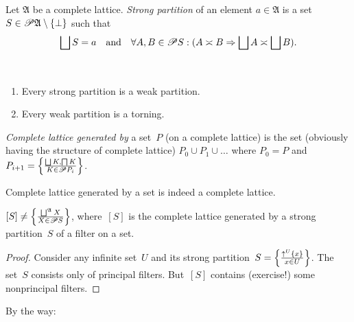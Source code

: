 \begin{defn}
Let $\mathfrak{A}$ be a complete lattice.
\emph{Strong partition} of an element $a\in\mathfrak{A}$ is a set
$S\in\mathscr{P}\mathfrak{A}\setminus\{\bot\}$ such that
\[
\bigsqcup S=a\quad\text{and}\quad\forall A,B\in\subsets S:(A\asymp B\Rightarrow\bigsqcup A\asymp\bigsqcup B).
\]
\end{defn}
\begin{obvious}
~
\begin{enumerate}
\item Every strong partition is a weak partition.
\item Every weak partition is a torning.
\end{enumerate}
\end{obvious}

\begin{defn}
\emph{Complete lattice generated by} a set~$P$ (on a complete lattice)
is the set (obviously having the structure of complete lattice)
$P_0\cup P_1\cup\dots$
where $P_0=P$ and
$P_{i+1}=\setcond{\bigsqcup K, \bigsqcap K}{K\in\subsets P_i}$.
\end{defn}

\begin{obvious}
Complete lattice generated by a set is indeed a complete lattice.
\end{obvious}

\begin{example}
$[S] \ne \setcond{\bigsqcup^{\mathfrak{A}}X}{X\in\subsets S}$, where~$[S]$ is the complete lattice generated by
a strong partition~$S$ of a filter on a set.
\end{example}

\begin{proof}
Consider any infinite set~$U$ and its strong partition~$S=\left\{ \frac{\uparrow^U\{x\}}{x\in U}\right\}$.
The set~$S$ consists only of principal filters. But~$[S]$ contains (exercise!) some
nonprincipal filters.
\end{proof}

By the way:

